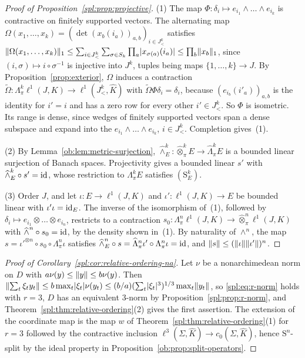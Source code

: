 \begin{proof}[Proof of Proposition~\ref{spl:prop:projective}]
(1) The map $\Phi\colon\delta_i\mapsto e_{i_1}\wedge\dots\wedge e_{i_k}$ is contractive on finitely supported vectors.
The alternating map $\Omega(x_1,\dots,x_k)=(\det(x_b(i_a))_{a,b})_{i\in J^k_<}$ satisfies
$\lVert \Omega(x_1,\dots,x_k)\rVert_1\le\sum_{i\in J^k_<}\sum_{\sigma\in S_k}\prod_a\lvert x_{\sigma(a)}(i_a)\rvert\le\prod_b\lVert x_b\rVert_1$,
since $(i,\sigma)\mapsto i\circ\sigma^{-1}$ is injective into $J^k$, tuples being maps $\{1,\dots,k\}\to J$. By
Proposition~\ref{prop:exterior}, $\Omega$ induces a contraction
$\widetilde\Omega\colon\Lambda^k_\pi\ell^1(J,K)\to\ell^1(J^k_<,\widehat K)$ with $\widetilde\Omega\Phi\delta_i=\delta_i$,
because $(e_{i_b}(i'_a))_{a,b}$ is the identity for $i'=i$ and has a zero row for every other $i'\in J^k_<$. So $\Phi$ is
isometric. Its range is dense, since wedges of finitely supported vectors span a dense subspace and expand into the
$e_{i_1}\wedge\dots\wedge e_{i_k}$, $i\in J^k_<$. Completion gives~(1).

(2) By Lemma~\ref{ob:lem:metric-surjection}, $\widehat\wedge^k_E\colon\widehat\otimes^k_\pi E\to\widehat\Lambda^k_\pi E$
is a bounded linear surjection of Banach spaces. Projectivity gives a bounded linear $s'$ with
$\widehat\wedge^k_E\circ s'=\mathrm{id}$, whose restriction to $\Lambda^k_\pi E$ satisfies $(\mathrm S^k_E)$.

(3) Order $J$, and let $\iota\colon E\to\ell^1(J,K)$ and $\iota'\colon\ell^1(J,K)\to E$ be bounded linear with
$\iota'\iota=\mathrm{id}_E$. The inverse of the isomorphism of~(1), followed by $\delta_i\mapsto e_{i_1}\otimes\dots\otimes
e_{i_n}$, restricts to a contraction $s_0\colon\Lambda^n_\pi\ell^1(J,K)\to\widehat\otimes^n_\pi\ell^1(J,K)$ with
$\widehat\wedge^n\circ s_0=\mathrm{id}$, by the density shown in~(1). By naturality of $\wedge^n$, the map
$s=\iota'^{\otimes n}\circ s_0\circ\Lambda^n_\pi\iota$ satisfies $\widehat\wedge^n_E\circ s=\widehat\Lambda^n_\pi\iota'
\circ\Lambda^n_\pi\iota=\mathrm{id}$, and $\lVert s\rVert\le(\lVert \iota\rVert\lVert \iota'\rVert)^n$.
\end{proof}

\begin{proof}[Proof of Corollary~\ref{spl:cor:relative-ordering-na}]
Let $\nu$ be a nonarchimedean norm on $D$ with $a\nu(y)\le\lVert y\rVert\le b\nu(y)$. Then
$\lVert \sum_t\xi_ty_t\rVert\le b\max_t\lvert \xi_t\rvert\nu(y_t)\le(b/a)(\sum_t\lvert \xi_t\rvert^3)^{1/3}\max_t\lVert y_t\rVert$, so
\eqref{spl:eq:r-norm} holds with $r=3$, $D$ has an equivalent $3$-norm by Proposition~\ref{spl:prop:r-norm}, and
Theorem~\ref{spl:thm:relative-ordering}(2) gives the first assertion. The extension of the coordinate map is the map $w$ of
Theorem~\ref{spl:thm:relative-ordering}(1) for $r=3$ followed by the contractive inclusion
$\ell^3(\Sigma,\widehat K)\to c_0(\Sigma,\widehat K)$, hence $\mathrm S^n$-split by the ideal property in
Proposition~\ref{ob:prop:split-operators}.
\end{proof}

